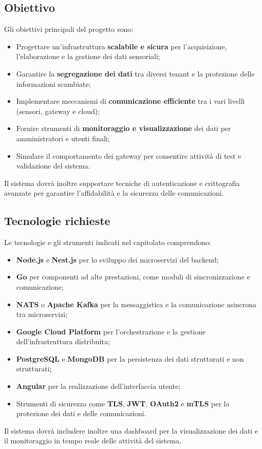 \documentclass[a4paper,12pt]{article}
\begin{document}
{{{    \subsection{Obiettivo}
        Gli obiettivi principali del progetto sono:
        \begin{itemize}
            \item Progettare un’infrastruttura \textbf{scalabile e sicura} per l’acquisizione, l’elaborazione e la gestione dei dati sensoriali;
            \item Garantire la \textbf{segregazione dei dati} tra diversi tenant e la protezione delle informazioni scambiate;
            \item Implementare meccanismi di \textbf{comunicazione efficiente} tra i vari livelli (sensori, gateway e cloud);
            \item Fornire strumenti di \textbf{monitoraggio e visualizzazione} dei dati per amministratori e utenti finali;
            \item Simulare il comportamento dei gateway per consentire attività di test e validazione del sistema.
        \end{itemize}
        Il sistema dovrà inoltre supportare tecniche di autenticazione e crittografia avanzate per garantire l’affidabilità e la sicurezza delle comunicazioni.
    

    \subsection{Tecnologie richieste}
        Le tecnologie e gli strumenti indicati nel capitolato comprendono:
        \begin{itemize}
            \item \textbf{Node.js} e \textbf{Nest.js} per lo sviluppo dei microservizi del backend;
            \item \textbf{Go} per componenti ad alte prestazioni, come moduli di sincronizzazione e comunicazione;
            \item \textbf{NATS} o \textbf{Apache Kafka} per la messaggistica e la comunicazione asincrona tra microservizi;
            \item \textbf{Google Cloud Platform} per l’orchestrazione e la gestione dell’infrastruttura distribuita;
            \item \textbf{PostgreSQL} e \textbf{MongoDB} per la persistenza dei dati strutturati e non strutturati;
            \item \textbf{Angular} per la realizzazione dell’interfaccia utente;
            \item Strumenti di sicurezza come \textbf{TLS}, \textbf{JWT}, \textbf{OAuth2} e \textbf{mTLS} per la protezione dei dati e delle comunicazioni.
        \end{itemize}
        Il sistema dovrà includere inoltre una dashboard per la visualizzazione dei dati e il monitoraggio in tempo reale delle attività del sistema.
    

}}}
\end{document}
